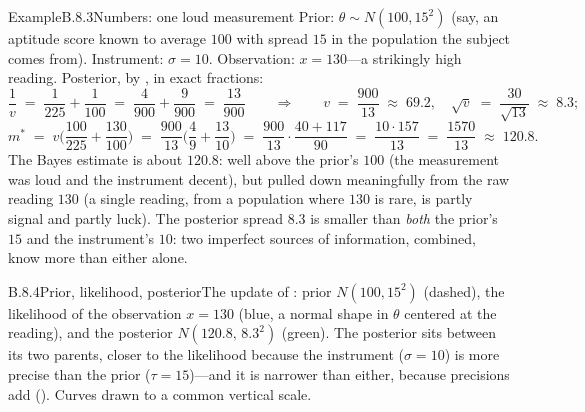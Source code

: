 \documentclass[main.tex]{subfiles}
\begin{document}
\begin{ObjL}{Example}{B.8.3}{Numbers: one loud measurement}
Prior: $\theta\sim N(100, 15^2)$ (say, an aptitude score known to average $100$ with
spread $15$ in the population the subject comes from). Instrument: $\sigma=10$. Observation:
$x=130$---a strikingly high reading. Posterior, by , in exact fractions:
\[ \frac1v \;=\; \frac{1}{225}+\frac{1}{100} \;=\; \frac{4}{900}+\frac{9}{900}
   \;=\; \frac{13}{900}
   \qquad\Longrightarrow\qquad v \;=\; \frac{900}{13} \;\approx\; 69.2 ,
   \quad \sqrt{v} \;=\; \frac{30}{\sqrt{13}} \;\approx\; 8.3 ; \]
\[ m^{*} \;=\; v\Big( \frac{100}{225} + \frac{130}{100} \Big)
   \;=\; \frac{900}{13}\Big( \frac{4}{9} + \frac{13}{10} \Big)
   \;=\; \frac{900}{13}\cdot\frac{40 + 117}{90}
   \;=\; \frac{10\cdot 157}{13}
   \;=\; \frac{1570}{13} \;\approx\; 120.8 . \]
The Bayes estimate is about $120.8$: well above the prior's $100$ (the measurement was loud
and the instrument decent), but pulled down meaningfully from the raw reading $130$ (a
single reading, from a population where $130$ is rare, is partly signal and partly luck).
The posterior spread $8.3$ is smaller than \emph{both} the prior's $15$ and the
instrument's $10$: two imperfect sources of information, combined, know more than either
alone.
\end{ObjL}

\begin{Fig}{B.8.4}{Prior, likelihood, posterior}{The update of : prior
$N(100,15^2)$ (dashed), the likelihood of the observation $x=130$ (blue, a normal shape in
$\theta$ centered at the reading), and the posterior $N(120.8,\,8.3^2)$ (green). The
posterior sits between its two parents, closer to the likelihood because the instrument
($\sigma=10$) is more precise than the prior ($\tau=15$)---and it is narrower than either,
because precisions add (). Curves drawn to a common vertical scale.}
\end{Fig}
\end{document}
